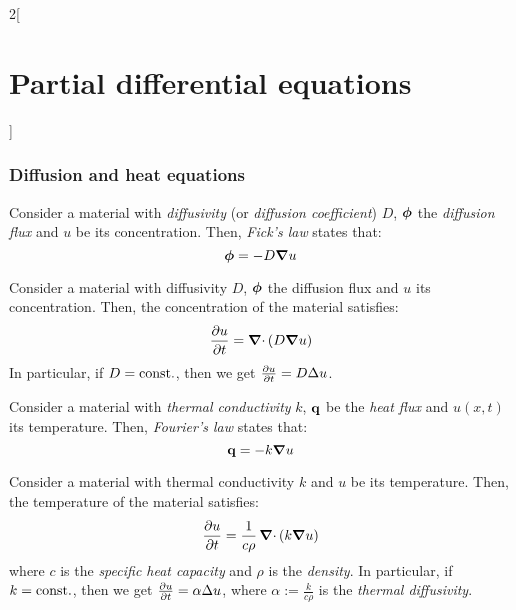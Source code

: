 \documentclass[../../../main_math.tex]{subfiles}
\begin{document}
\begin{multicols}{2}[\section{Partial differential equations}]
  \subsubsection{Diffusion and heat equations}
  \begin{proposition}
    Consider a material with \emph{diffusivity} (or \emph{diffusion coefficient}) $D$, $\boldsymbol{\mathrm{\phi}}$ the \emph{diffusion flux} and $u$ be its concentration. Then, \emph{Fick's law} states that: $$\boldsymbol{\mathrm{\phi}}=-D\grad{u}$$
  \end{proposition}
  \begin{proposition}
    Consider a material with diffusivity $D$, $\boldsymbol{\mathrm{\phi}}$ the diffusion flux and $u$ its concentration. Then, the concentration of the material satisfies: $$\pdv{u}{t}=\operatorname{\boldsymbol{\mathrm{\nabla}}\cdot}\left(D\grad{u}\right)$$
    In particular, if $D=\text{const.}$, then we get $\pdv{u}{t}=D\Delta{u}$.
  \end{proposition}
  \begin{proposition}
    Consider a material with \emph{thermal conductivity} $k$, $\boldsymbol{\mathrm{q}}$ be the \emph{heat flux} and $u(x,t)$ its temperature. Then, \emph{Fourier's law} states that: $$\boldsymbol{\mathrm{q}}=-k\grad{u}$$
  \end{proposition}
  \begin{proposition}
    Consider a material with thermal conductivity $k$ and $u$ be its temperature. Then, the temperature of the material satisfies: $$\pdv{u}{t}=\frac{1}{c\rho}\operatorname{\boldsymbol{\mathrm{\nabla}}\cdot}\left(k\grad{u}\right)$$
    where $c$ is the \emph{specific heat capacity} and $\rho$ is the \emph{density}. In particular, if $k=\text{const.}$, then we get $\pdv{u}{t}=\alpha\Delta{u}$, where $\alpha:=\frac{k}{c\rho}$ is the \emph{thermal diffusivity}.
  \end{proposition}

\end{multicols}
\end{document}
